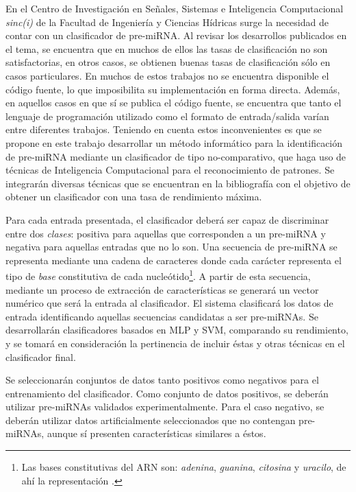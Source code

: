\documentclass[12pt,bibliography=oldstyle,DIV=14,parskip=full-,titlepage]{scrartcl}
\begin{document}
En el Centro de Investigación en Señales, Sistemas e Inteligencia
Computacional \emph{sinc(i)} de la Facultad de Ingeniería y Ciencias
Hídricas surge la necesidad de contar con un clasificador de
pre-miRNA. Al revisar los desarrollos publicados en el tema, se
encuentra que en muchos de ellos las tasas de clasificación no son
satisfactorias, en otros casos, se obtienen buenas tasas de
clasificación sólo en casos particulares.  En muchos de estos trabajos
no se encuentra disponible el código fuente, lo que imposibilita su
implementación en forma directa.  Además, en aquellos casos en que sí
se publica el código fuente, se encuentra que tanto el lenguaje de
programación utilizado como el formato de entrada/salida varían entre
diferentes trabajos.  Teniendo en cuenta estos inconvenientes es que
se propone en este trabajo desarrollar un método informático para la
identificación de pre-miRNA mediante un clasificador de tipo
no-comparativo, que haga uso de técnicas de Inteligencia Computacional
para el reconocimiento de patrones.  Se integrarán diversas técnicas
que se encuentran en la bibliografía con el objetivo de obtener un
clasificador con una tasa de rendimiento máxima.

Para cada entrada presentada, el clasificador deberá ser capaz de
discriminar entre dos \emph{clases}: positiva para aquellas que
corresponden a un pre-miRNA y negativa para aquellas entradas que no
lo son. 
Una secuencia de pre-miRNA se representa mediante una cadena de
caracteres  donde cada carácter representa el tipo
de \emph{base} constitutiva de cada nucleótido\footnote{Las bases
  constitutivas del ARN son: \emph{adenina}, \emph{guanina},
  \emph{citosina} y \emph{uracilo}, de ahí la representación .}.
A partir de esta secuencia, mediante un proceso de extracción de
características se generará un vector numérico que será la entrada al
clasificador.  El sistema clasificará los datos de entrada
identificando aquellas secuencias candidatas a ser pre-miRNAs.  Se
desarrollarán clasificadores basados en MLP y SVM, comparando su
rendimiento, y se tomará en consideración la pertinencia de incluir
éstas y otras técnicas en el clasificador final.

Se seleccionarán conjuntos de datos tanto positivos como negativos
para el entrenamiento del clasificador. Como conjunto de datos
positivos, se deberán utilizar pre-miRNAs validados experimentalmente.
Para el caso negativo, se deberán utilizar datos artificialmente
seleccionados que no contengan pre-miRNAs, aunque sí presenten
características similares a éstos.
\end{document}
